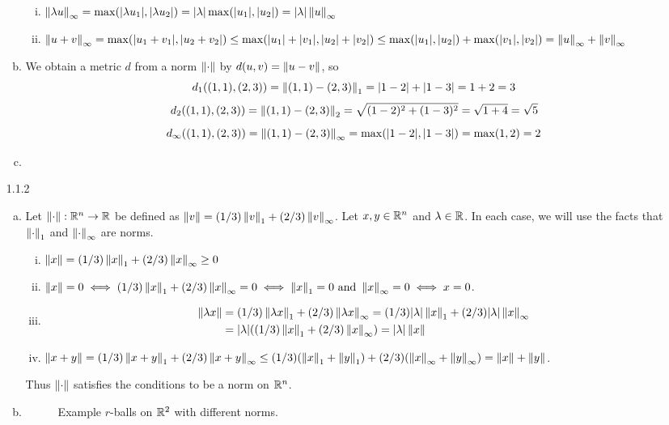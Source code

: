 \documentclass[../../Solutions.tex]{subfiles}
\begin{document}
\begin{itemize}
\begin{enumerate}[(a)]
\begin{enumerate}[(i)]
					\item $\left\lVert\lambda u\right\rVert_\infty = \max(|\lambda u_1|,|\lambda u_2|) = |\lambda|\max(|u_1|,|u_2|) = |\lambda|\left\lVert u\right\rVert_\infty$
					\item $\left\lVert u+v\right\rVert_\infty = \max(|u_1+v_1|,|u_2+v_2|) \leq \max(|u_1|+|v_1|,|u_2|+|v_2|) \leq \max(|u_1|,|u_2|)+\max(|v_1|,|v_2|) = \left\lVert u\right\rVert_\infty+\left\lVert v\right\rVert_\infty$
				\end{enumerate}
			\item We obtain a metric $d$ from a norm $\left\lVert\cdot\right\rVert$ by $d(u,v) = \left\lVert u-v\right\rVert$, so
				$$ d_1((1,1),(2,3)) = \left\lVert(1,1)-(2,3)\right\rVert_1 = |1-2|+|1-3| = 1+2 = 3 $$
				$$ d_2((1,1),(2,3)) = \left\lVert(1,1)-(2,3)\right\rVert_2 = \sqrt{(1-2)^2+(1-3)^2} = \sqrt{1+4} = \sqrt{5} $$
				$$ d_\infty((1,1),(2,3)) = \left\lVert(1,1)-(2,3)\right\rVert_\infty = \max(|1-2|,|1-3|) = \max(1,2) = 2 $$
			\item %
		\end{enumerate}
	
	\item [1.1.2]
		\begin{enumerate}[(a)]
			\item Let $\left\lVert\cdot\right\rVert:\mathbb{R}^n \to \mathbb{R}$ be defined as $\left\lVert v\right\rVert = (1/3)\left\lVert v\right\rVert_1+(2/3)\left\lVert v\right\rVert_\infty$.
				Let $x,y \in \mathbb{R}^n$ and $\lambda \in \mathbb{R}$.
				In each case, we will use the facts that $\left\lVert\cdot\right\rVert_1$ and $\left\lVert\cdot\right\rVert_\infty$ are norms.
				
				\begin{enumerate}[(i)]
					\item $\left\lVert x\right\rVert = (1/3)\left\lVert x\right\rVert_1+(2/3)\left\lVert x\right\rVert_\infty \geq 0$
					\item $\left\lVert x\right\rVert = 0 \iff (1/3)\left\lVert x\right\rVert_1+(2/3)\left\lVert x\right\rVert_\infty = 0 \iff \left\lVert x\right\rVert_1 = 0 \text{ and } \left\lVert x\right\rVert_\infty = 0 \iff x = 0$.
					\item \begin{equation*} \begin{split}
						 \left\lVert\lambda x\right\rVert & = (1/3)\left\lVert\lambda x\right\rVert_1+(2/3)\left\lVert\lambda x\right\rVert_\infty = (1/3)|\lambda|\left\lVert x\right\rVert_1+(2/3)|\lambda|\left\lVert x\right\rVert_\infty \\
							 & = |\lambda|((1/3)\left\lVert x\right\rVert_1+(2/3)\left\lVert x\right\rVert_\infty) = |\lambda|\left\lVert x\right\rVert
					\end{split} \end{equation*}
					\item $\left\lVert x+y\right\rVert = (1/3)\left\lVert x+y\right\rVert_1+(2/3)\left\lVert x+y\right\rVert_\infty \leq (1/3)(\left\lVert x\right\rVert_1+\left\lVert y\right\rVert_1)+(2/3)(\left\lVert x\right\rVert_\infty+\left\lVert y\right\rVert_\infty) = \left\lVert x\right\rVert+\left\lVert y\right\rVert$.
				\end{enumerate}
				Thus $\left\lVert\cdot\right\rVert$ satisfies the conditions to be a norm on $\mathbb{R}^n$.
			\item 
				\begin{figure}[h]
					\begin{center}
						\framebox[0.80\textwidth]{
							
						}
					\end{center}
					\caption[]{\label{fig:example_balls_R2norms} Example $r$-balls on $\mathbb{R}^2$ with different norms.}
				\end{figure}
		\end{enumerate}
	

\end{itemize}
\end{document}
